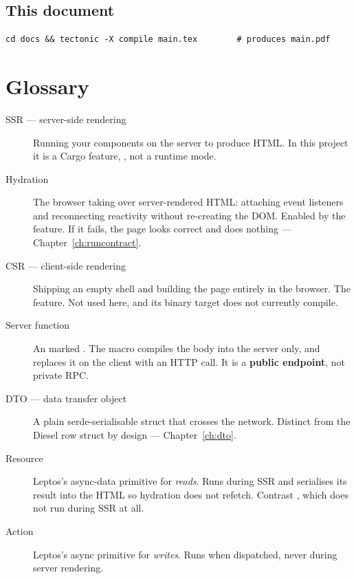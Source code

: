 \section{This document}

\begin{lstlisting}[style=sh]
cd docs && tectonic -X compile main.tex        # produces main.pdf
\end{lstlisting}

\chapter{Glossary}

\begin{description}
  \item[SSR --- server-side rendering] Running your components on the server to produce HTML. In
    this project it is a Cargo feature, , not a runtime mode.

  \item[Hydration] The browser taking over server-rendered HTML: attaching event listeners and
    reconnecting reactivity without re-creating the DOM. Enabled by the  feature. If
    it fails, the page looks correct and does nothing --- Chapter~\ref{ch:runcontract}.

  \item[CSR --- client-side rendering] Shipping an empty shell and building the page entirely in the
    browser. The  feature. Not used here, and its binary target does not currently
    compile.

  \item[Server function] An  marked \code{\#[server]}. The macro compiles the body
    into the server only, and replaces it on the client with an HTTP call. It is a
    \textbf{public endpoint}, not private RPC.

  \item[DTO --- data transfer object] A plain serde-serialisable struct that crosses the network.
    Distinct from the Diesel row struct by design --- Chapter~\ref{ch:dto}.

  \item[Resource] Leptos's async-data primitive for \emph{reads}. Runs during SSR and serialises its
    result into the HTML so hydration does not refetch. Contrast , which does
    not run during SSR at all.

  \item[Action] Leptos's async primitive for \emph{writes}. Runs when dispatched, never during
    server rendering.


\end{description}
